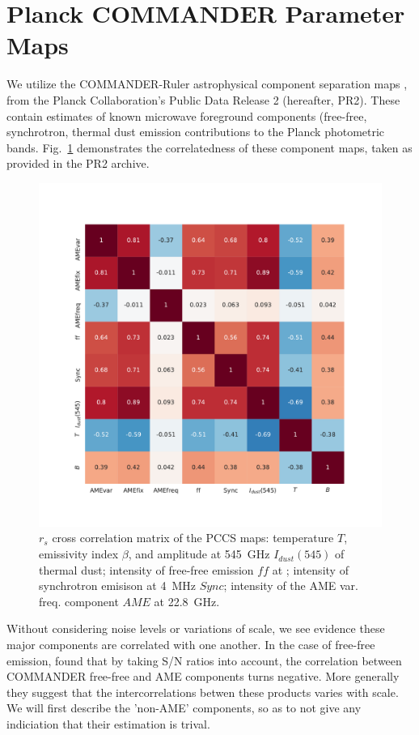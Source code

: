   \section{Planck COMMANDER Parameter Maps}
  \label{sec:PCmaps}
       We utilize the COMMANDER-Ruler astrophysical component separation maps \citep{planckXII}, from the Planck Collaboration's Public Data Release 2 (hereafter, PR2)\citep{planck2015I}. These contain estimates of known microwave foreground components (free-free, synchrotron, thermal dust emission contributions to the Planck photometric bands. Fig.~\ref{fig:PCCS_corrmatrix} demonstrates the correlatedness of these component maps, taken as provided in the PR2 archive.
         \begin{figure}
           \includegraphics[width=\textwidth]{../Plots/ch_datasources/PCCS_corrmatrix.pdf}
           \centering
           \caption{$r_{s}$ cross correlation matrix of the PCCS maps: temperature $T$, emissivity index $\beta$, and amplitude at 545~GHz $I_{dust}(545)$ of thermal dust; intensity of free-free emission $ff$ at ; intensity of synchrotron emisison at 4~MHz $Sync$; intensity of the AME var. freq. component $AME$ at 22.8~GHz.}
           \label{fig:PCCS_corrmatrix}
         \end{figure}
        Without considering noise levels or variations of scale, we see evidence these major components are correlated with one another. In the case of free-free emission,  \cite{vonHausegger15} found that by taking S/N ratios into account, the correlation between COMMANDER free-free and AME components turns negative. More generally they suggest that the intercorrelations betwen these products varies with scale. We will first describe the 'non-AME' components, so as to not give any indiciation that their estimation is trival.

